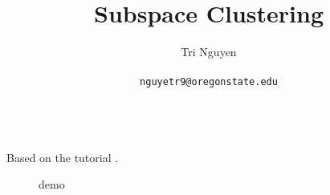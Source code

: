 \documentclass[11pt,a4paper]{article}
\title{Subspace Clustering}
\author{	Tri Nguyen \\\\
        \texttt{nguyetr9@oregonstate.edu} \\\\
        }
\begin{document}
\maketitle

Based on the tutorial \cite{vidal2011subspace_tutorial}.

\begin{figure}[ht]
    \centering
    \caption{demo}
    \label{fig:demo}
\end{figure}
\end{document}
